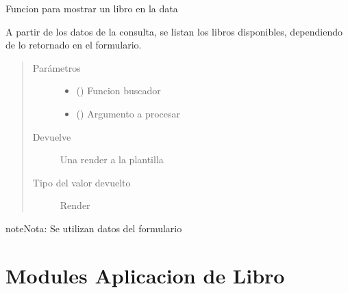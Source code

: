 \documentclass[letterpaper,10pt,spanish]{sphinxmanual}
\begin{document}
\begin{fulllineitems}
\label{\detokenize{modules/libro/views:libro.views.buscador}}
Funcion para mostrar un libro en la data

A partir de los datos de la consulta, se listan los libros disponibles, dependiendo de lo retornado en el formulario.
\begin{quote}\begin{description}
\item[{Parámetros}] \leavevmode\begin{itemize}
\item {} 
 () \textendash{} Funcion buscador

\item {} 
 () \textendash{} Argumento a procesar

\end{itemize}

\item[{Devuelve}] \leavevmode
Una render a la plantilla 

\item[{Tipo del valor devuelto}] \leavevmode
Render

\end{description}\end{quote}

\begin{sphinxadmonition}{note}{Nota:}
Se utilizan datos del formulario 
\end{sphinxadmonition}

\end{fulllineitems}



\section{Modules Aplicacion de Libro}
\label{\detokenize{modules/libro/models:module-libro.models}}\label{\detokenize{modules/libro/models:modules-aplicacion-de-libro}}\label{\detokenize{modules/libro/models::doc}}
\end{document}
